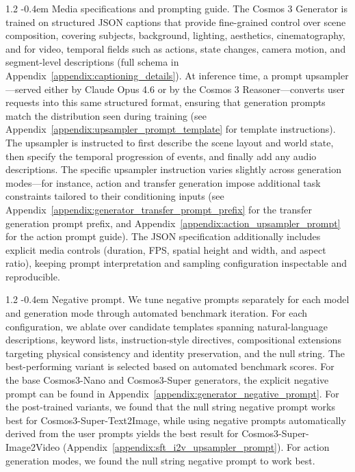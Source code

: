 \documentclass{llmxive}
\makeatletter
\providecommand{\paragraph}{  \@startsection{paragraph}{4}{\z@}    {1\baselineskip \@plus .2\baselineskip}    {-0.4em}    {\normalfont\normalsize\bfseries}}
\makeatother
\begin{document}
\paragraph{Media specifications and prompting guide.}
The Cosmos 3 Generator is trained on structured JSON captions that provide fine-grained control over scene composition, covering subjects, background, lighting, aesthetics, cinematography, and for video, temporal fields such as actions, state changes, camera motion, and segment-level descriptions (full schema in Appendix~\ref{appendix:captioning_details}). At inference time, a prompt upsampler---served either by Claude Opus 4.6 or by the Cosmos 3 Reasoner---converts user requests into this same structured format, ensuring that generation prompts match the distribution seen during training (see Appendix~\ref{appendix:upsampler_prompt_template} for template instructions). The upsampler is instructed to first describe the scene layout and world state, then specify the temporal progression of events, and finally add any audio descriptions. The specific upsampler instruction varies slightly across generation modes---for instance, action and transfer generation impose additional task constraints tailored to their conditioning inputs (see Appendix~\ref{appendix:generator_transfer_prompt_prefix} for the transfer generation prompt prefix, and Appendix~\ref{appendix:action_upsampler_prompt} for the action prompt guide). The JSON specification additionally includes explicit media controls (duration, FPS, spatial height and width, and aspect ratio), keeping prompt interpretation and sampling configuration inspectable and reproducible.

\paragraph{Negative prompt.}
We tune negative prompts separately for each model and generation mode through automated benchmark iteration. For each configuration, we ablate over candidate templates spanning natural-language descriptions, keyword lists, instruction-style directives, compositional extensions targeting physical consistency and identity preservation, and the null string. The best-performing variant is selected based on automated benchmark scores. For the base Cosmos3-Nano and Cosmos3-Super generators, the explicit negative prompt can be found in Appendix~\ref{appendix:generator_negative_prompt}. For the post-trained variants, we found that the null string negative prompt works best for Cosmos3-Super-Text2Image, while using negative prompts automatically derived from the user prompts yields the best result for Cosmos3-Super-Image2Video (Appendix~\ref{appendix:sft_i2v_upsampler_prompt}). For action generation modes, we found the null string negative prompt to work best.
\end{document}
